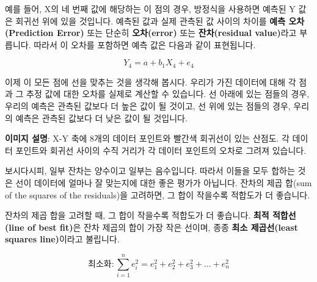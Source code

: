 \documentclass[11pt,a4paper]{article}
\theoremstyle{definition}
\begin{document}
\begin{tcolorbox}[infobox, title=회귀 방정식 (Regression Equation)]
예를 들어, X의 네 번째 값에 해당하는 이 점의 경우, 방정식을 사용하면 예측된 Y 값은 회귀선 위에 있을 것입니다. 예측된 값과 실제 관측된 값 사이의 차이를 \textbf{예측 오차(Prediction Error)} 또는 단순히 \textbf{오차(error)} 또는 \textbf{잔차(residual value)}라고 부릅니다. 따라서 이 오차를 포함하면 예측 값은 다음과 같이 표현됩니다.

\begin{equation*}
Y_4 = a + b_1X_4 + e_4
\end{equation*}

이제 이 모든 점에 선을 맞추는 것을 생각해 봅시다. 우리가 가진 데이터에 대해 각 점과 그 추정 값에 대한 오차를 실제로 계산할 수 있습니다. 선 아래에 있는 점들의 경우, 우리의 예측은 관측된 값보다 더 높은 값이 될 것이고, 선 위에 있는 점들의 경우, 우리의 예측은 관측된 값보다 더 낮은 값이 될 것입니다.

\begin{center}
\end{center}
\textbf{이미지 설명}: X-Y 축에 8개의 데이터 포인트와 빨간색 회귀선이 있는 산점도. 각 데이터 포인트와 회귀선 사이의 수직 거리가 각 데이터 포인트의 오차로 그려져 있습니다.

보시다시피, 일부 잔차는 양수이고 일부는 음수입니다. 따라서 이들을 모두 합하는 것은 선이 데이터에 얼마나 잘 맞는지에 대한 좋은 평가가 아닙니다. 잔차의 제곱 합(sum of the squares of the residuals)을 고려하면, 그 합이 작을수록 적합도가 더 좋습니다.
\end{tcolorbox}

\begin{tcolorbox}[infobox, title=최적 적합선 (Line of Best Fit)]
잔차의 제곱 합을 고려할 때, 그 합이 작을수록 적합도가 더 좋습니다. \textbf{최적 적합선(line of best fit)}은 잔차 제곱의 합이 가장 작은 선이며, 종종 \textbf{최소 제곱선(least squares line)}이라고 불립니다.

\begin{equation*}
\text{최소화}: \sum_{i=1}^{n} e_i^2 = e_1^2 + e_2^2 + e_3^2 + \dots + e_n^2
\end{equation*}
\end{tcolorbox}
\end{document}
